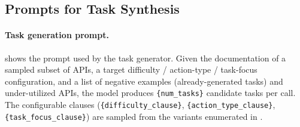 %

\subsection{Prompts for Task Synthesis}
\paragraph{Task generation prompt.}
 shows the prompt used by the task generator. Given the documentation of a sampled subset of APIs, a target difficulty / action-type / task-focus configuration, and a list of negative examples (already-generated tasks) and under-utilized APIs, the model produces \texttt{\{num\_tasks\}} candidate tasks per call. The configurable clauses (\texttt{\{difficulty\_clause\}}, \texttt{\{action\_type\_clause\}}, \texttt{\{task\_focus\_clause\}}) are sampled from the variants enumerated in .

